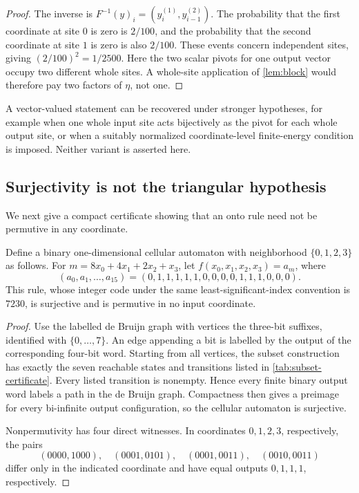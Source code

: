 \begin{proof}
The inverse is
$F^{-1}(y)_i=(y_i^{(1)},y_{i-1}^{(2)})$.  The probability that the first
coordinate at site $0$ is zero is $2/100$, and the probability that the
second coordinate at site $1$ is zero is also $2/100$.  These events concern
independent sites, giving $(2/100)^2=1/2500$.  Here the two scalar pivots for
one output vector occupy two different whole sites.  A whole-site
application of \cref{lem:block} would therefore pay two factors of $\eta$,
not one.
\end{proof}

A vector-valued statement can be recovered under stronger hypotheses, for
example when one whole input site acts bijectively as the pivot for each
whole output site, or when a suitably normalized coordinate-level
finite-energy condition is imposed.  Neither variant is asserted here.

\subsection{Surjectivity is not the triangular hypothesis}

We next give a compact certificate showing that an onto rule need not be
permutive in any coordinate.

\begin{proposition}
\label{prop:surjective-firewall}
Define a binary one-dimensional cellular automaton with neighborhood
$\{0,1,2,3\}$ as follows.  For
$m=8x_0+4x_1+2x_2+x_3$, let
$f(x_0,x_1,x_2,x_3)=a_m$, where
\[
  (a_0,a_1,\ldots,a_{15})
  =(0,1,1,1,1,1,0,0,0,0,1,1,1,0,0,0).
\]
This rule, whose integer code under the same least-significant-index
convention is $7230$, is surjective and is permutive in no input coordinate.
\end{proposition}

\begin{proof}
Use the labelled de Bruijn graph with vertices the three-bit suffixes,
identified with $\{0,\ldots,7\}$.  An edge appending a bit is labelled by the
output of the corresponding four-bit word.  Starting from all vertices, the
subset construction has exactly the seven reachable states and transitions
listed in \cref{tab:subset-certificate}.  Every listed transition is
nonempty.  Hence every finite binary output word labels a path in the de
Bruijn graph.  Compactness then gives a preimage for every bi-infinite output
configuration, so the cellular automaton is surjective.



Nonpermutivity has four direct witnesses.  In coordinates $0,1,2,3$,
respectively, the pairs
\[
 (0000,1000),\quad(0001,0101),\quad
 (0001,0011),\quad(0010,0011)
\]
differ only in the indicated coordinate and have equal outputs
$0,1,1,1$, respectively.
\end{proof}

